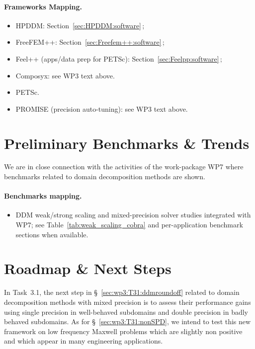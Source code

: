 \paragraph{Frameworks Mapping.}
\begin{itemize}
  \item HPDDM: Section~\ref{sec:HPDDM:software}\,; 
  \item FreeFEM++: Section~\ref{sec:Freefem++:software}\,; 
  \item Feel++ (apps/data prep for PETSc): Section~\ref{sec:Feelpp:software}\,; 
  \item Composyx: see WP3 text above.
  \item PETSc.
  \item PROMISE (precision auto-tuning): see WP3 text above.
\end{itemize}

\section{Preliminary Benchmarks \& Trends}
We are in close connection with the activities of the work-package WP7 where benchmarks related to domain decomposition methods are shown. 

\paragraph{Benchmarks mapping.}
\begin{itemize}
  \item DDM weak/strong scaling and mixed-precision solver studies integrated with WP7; see Table~\ref{tab:weak_scaling_cobra} and per-application benchmark sections when available.
\end{itemize}

\section{Roadmap \& Next Steps}


In Task~3.1, the next step in \S~\ref{sec:wp3:T31:ddmroundoff} related to domain decomposition 
methods with mixed precision is to assess their performance gains using single precision in well-behaved subdomains and double precision in badly behaved subdomains. As for \S~\ref{sec:wp3:T31:nonSPD}, we intend to test this new framework on low frequency Maxwell problems which are slightly non positive and which appear in many engineering applications. 


